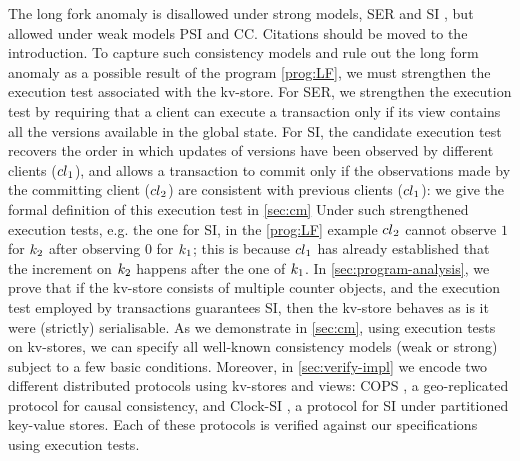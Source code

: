 The long fork anomaly is disallowed under strong models, \eg SER and 
SI \cite{fekete-tods}, 
but allowed under weak models \eg PSI  \cite{PSI} and CC. 
\ac{Citations should be moved to the introduction.}
%
To capture such consistency models and rule out the long form anomaly as a possible result 
of the program \eqref{prog:LF}, we must strengthen the execution test associated with the kv-store. 
For SER, we strengthen the execution test by requiring that a client can execute a transaction 
only if its view contains all the versions available in the global state. 
For SI, 
the candidate execution test recovers the order in which 
updates of versions have been observed by different clients (\eg ${cl}_1$), 
and allows a transaction to commit only if the observations made by the committing client (\eg ${cl}_2$) 
are consistent with previous clients (\ie ${cl}_1$): we give the formal definition of this execution test 
in \cref{sec:cm}
Under such strengthened execution tests, e.g. the one for SI, in the \eqref{prog:LF} example ${cl}_2$ cannot
observe $1$ for $k_2$ after observing $0$ for $k_1$; 
this is because ${cl}_1$ has already established that the increment on $k_2$ happens after 
the one of $k_1$. 
In \cref{sec:program-analysis}, we prove that if the kv-store consists of multiple counter objects, and the execution test employed by transactions guarantees SI, then the kv-store 
behaves as is it were (strictly) serialisable.
%
As we demonstrate in \cref{sec:cm}, using execution tests on kv-stores, we can specify all well-known consistency models (weak or strong) subject to a few basic conditions. 
%
Moreover, in \cref{sec:verify-impl} we encode two different distributed protocols using kv-stores and views: COPS \cite{cops}, 
a geo-replicated protocol for causal consistency, and Clock-SI \cite{clocksi}, a protocol for SI under partitioned key-value stores.
Each of these protocols is verified against our specifications using execution tests.
